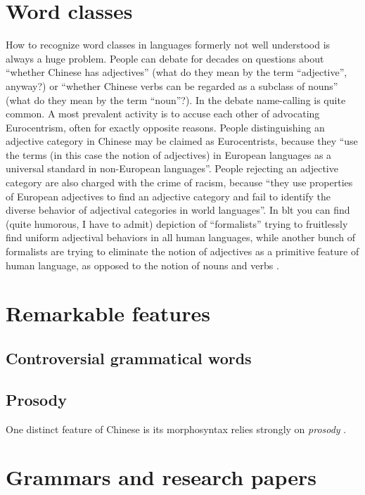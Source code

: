 \section{Word classes}\label{sec:word-class-intro}

How to recognize word classes in languages formerly not well understood is always a huge problem.
People can debate for decades on questions about ``whether Chinese has adjectives'' (what do they mean 
by the term ``adjective'', anyway?) or ``whether Chinese verbs can be regarded as a subclass of nouns''
(what do they mean by the term ``noun''?). In the debate name-calling is quite common. 
A most prevalent activity is to accuse each other of 
advocating Eurocentrism, often for exactly opposite reasons. People distinguishing an adjective 
category in Chinese may be claimed as Eurocentrists, because they ``use the terms (in this case 
the notion of adjectives) in European languages as a universal standard in non-European languages''.
People rejecting an adjective category are also charged with the crime of racism, because 
``they use properties of European adjectives to find an adjective category and fail to identify 
the diverse behavior of adjectival categories in world languages''. In \ac{blt} you can find 
(quite humorous, I have to admit) depiction of ``formalists'' trying to fruitlessly find uniform adjectival 
behaviors in all human languages, while another bunch of formalists are trying to eliminate the 
notion of adjectives as a primitive feature of human language, as opposed to the notion of nouns and verbs \citep{Mitrovi2020}.

\section{Remarkable features}

\subsection{Controversial grammatical words}

\subsection{Prosody}\label{sec:prosody-intro}

One distinct feature of Chinese is its morphosyntax relies strongly on \emph{prosody} \citep{feng2013}. 


\section{Grammars and research papers}

